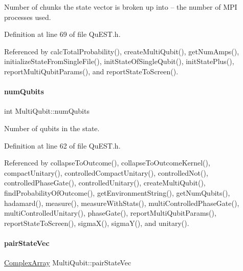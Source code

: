 Number of chunks the state vector is broken up into -- the number of M\+PI processes used. 



Definition at line 69 of file Qu\+E\+S\+T.\+h.



Referenced by calc\+Total\+Probability(), create\+Multi\+Qubit(), get\+Num\+Amps(), initialize\+State\+From\+Single\+File(), init\+State\+Of\+Single\+Qubit(), init\+State\+Plus(), report\+Multi\+Qubit\+Params(), and report\+State\+To\+Screen().

\mbox{\label{structMultiQubit_ab5b9795bdc6fb5855e1974dcbbaeb36f}} 
\paragraph{\texorpdfstring{num\+Qubits}{numQubits}}
{\footnotesize\ttfamily int Multi\+Qubit\+::num\+Qubits}



Number of qubits in the state. 



Definition at line 62 of file Qu\+E\+S\+T.\+h.



Referenced by collapse\+To\+Outcome(), collapse\+To\+Outcome\+Kernel(), compact\+Unitary(), controlled\+Compact\+Unitary(), controlled\+Not(), controlled\+Phase\+Gate(), controlled\+Unitary(), create\+Multi\+Qubit(), find\+Probability\+Of\+Outcome(), get\+Environment\+String(), get\+Num\+Qubits(), hadamard(), measure(), measure\+With\+Stats(), multi\+Controlled\+Phase\+Gate(), multi\+Controlled\+Unitary(), phase\+Gate(), report\+Multi\+Qubit\+Params(), report\+State\+To\+Screen(), sigma\+X(), sigma\+Y(), and unitary().

\mbox{\label{structMultiQubit_a76f7db4eab52d2b30f58f973ada809c5}} 
\paragraph{\texorpdfstring{pair\+State\+Vec}{pairStateVec}}
{\footnotesize\ttfamily \mbox{\hyperlink{structComplexArray}{Complex\+Array}} Multi\+Qubit\+::pair\+State\+Vec}




